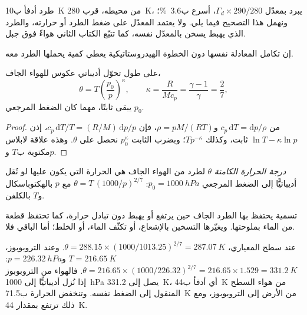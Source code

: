 طرد أدفأ ب\qty{10}{K} من محيطه، قرب \qty{280}{K}، يبرد بمعدّل $\Gamma_d \times 290/280$، أسرع ب\qty{3.6}{\percent}؛ ونهمل هذا التصحيح فيما يلي. ولا يعتمد المعدّل على ضغط الطرد أو حرارته، والطرد الذي يهبط يسخن بالمعدّل نفسه، كما
تتبّع الكتاب الثاني هواءً فوق جبل.

إن تكامل المعادلة نفسها دون الخطوة الهيدروستاتيكية يعطي كمية يحملها الطرد معه.

\begin{proposition}\label{prop:b1:fluid-envelopes-structure:theta}
على طول تحوّل أديباتي عكوس للهواء الجاف،
\[
  \theta = T\left(\frac{p_0}{p}\right)^{\kappa},\qquad \kappa = \frac{R}{Mc_p} =
  \frac{\gamma - 1}{\gamma} = \frac{2}{7},
\]
يبقى ثابتًا، مهما كان الضغط المرجعي $p_0$.
\end{proposition}

\begin{proof}
من $c_p\,\mathrm dT = \mathrm dp/\rho$ و$\rho = pM/(RT)$، فإن $c_p\,\mathrm dT/T
= (R/M)\,\mathrm dp/p$، إذن $\ln T - \kappa \ln p$ ثابت، وكذلك $T
p^{-\kappa}$؛ وبضرب الثابت $p_0^{\kappa}$ نحصل على $\theta$. وهذه علاقة لابلاس مكتوبة ب$T$ و$p$.
\end{proof}

\begin{definition}\label{def:b1:fluid-envelopes-structure:potential-temperature}
\emph{درجة الحرارة الكامنة} $\theta$ لطرد من الهواء الجاف هي الحرارة التي يكون عليها لو نُقل أديباتيًّا إلى الضغط المرجعي $p_0 = \qty{1000}{hPa}$: $\theta = T\,(1000/p)^{2/7}$ مع $p$ بالهكتوباسكال و$T$ بالكلفن.
\end{definition}

 تسمية يحتفظ بها الطرد الجاف حين يرتفع أو يهبط دون تبادل حرارة، كما تحتفظ قطعة من الماء بملوحتها. ويغيّرها التسخين بالإشعاع، أو تكثّف الماء، أو الخلط؛ أما الباقي فلا.

\begin{example}\label{ex:b1:fluid-envelopes-structure:tropopause}
عند سطح المعياري، $\theta = 288.15 \times (1000/1013.25)^{2/7} =
\qty{287.07}{K}$. وعند التروبوبوز، $T = \qty{216.65}{K}$ و$p =
\qty{226.32}{hPa}$:
$\theta = 216.65 \times (1000/226.32)^{2/7} = 216.65 \times
1.529 = \qty{331.2}{K}$. فالهواء من التروبوبوز إذا نُزل أديباتيًّا إلى \qty{1000}{hPa} يصل إلى \qty{331.2}{K}، أي أدفأ ب\qty{44}{K} من هواء السطح المنقول إلى الضغط نفسه. وتنخفض الحرارة ب\qty{71.5}{K} من الأرض إلى التروبوبوز، ومع ذلك ترتفع  بمقدار \qty{44}{K}.
\end{example}


